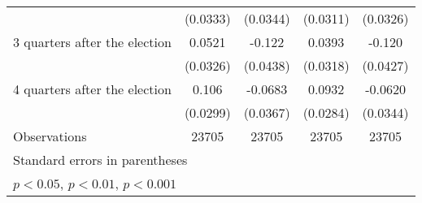 \begin{table}[htbp]
\begin{tabular}{l*{4}{c}}
                    &    (0.0333)         &    (0.0344)         &    (0.0311)         &    (0.0326)         \\
[1em]
 3 quarters after the election&      0.0521         &      -0.122\sym{**} &      0.0393         &      -0.120\sym{**} \\
                    &    (0.0326)         &    (0.0438)         &    (0.0318)         &    (0.0427)         \\
[1em]
 4 quarters after the election&       0.106\sym{***}&     -0.0683         &      0.0932\sym{**} &     -0.0620         \\
                    &    (0.0299)         &    (0.0367)         &    (0.0284)         &    (0.0344)         \\
\hline
Observations        &       23705         &       23705         &       23705         &       23705         \\
\hline\hline
\multicolumn{5}{l}{\footnotesize Standard errors in parentheses}\\
\multicolumn{5}{l}{\footnotesize \sym{*} \(p<0.05\), \sym{**} \(p<0.01\), \sym{***} \(p<0.001\)}\\
\end{tabular}
\end{table}

